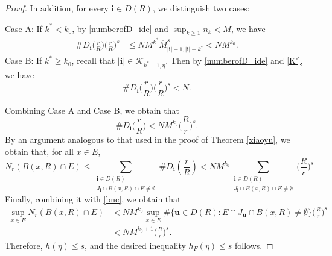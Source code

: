 \documentclass[12pt]{amsart}
\numberwithin{equation}{section}
\theoremstyle{plain}
\theoremstyle{remark}
\theoremstyle{definition}
\newcommand{\ok}{\overline{\mathcal{K}}}
\newcommand{\om}{\overline{M}}
\newcommand{\iii}{\mathbf{i}}
\newcommand{\bu}{\mathbf{u}}
\newcommand{\f}{\frac}
\renewcommand{\ge}{\geqslant}
\renewcommand{\le}{\leqslant}
\renewcommand{\leq}{\leqslant}
\begin{document}
\begin{proof}
	In addition, for every $\iii\in D(R)$, we distinguish two cases:
		
		\noindent	Case A: If $k^* < k_0$,  by  \eqref{numberofD_ide} and $\sup_{k\ge 1} n_k<M$, we have
		\begin{align*}
			\# D_{\iii}\Big(\f rR\Big)\Big(\f rR\Big)^s
			& \le NM^{k^*}\om_{|\iii|+1,|\iii|+k^*}^s< NM^{k_0}.
		\end{align*}
		Case B: If $k^* \ge k_0$, recall that $|\iii|\in\ok_{k^*+1,\eta}$. Then by \eqref{numberofD_ide} and \eqref{K'}, we have
		$$	
		\# D_{\iii}\Big(\f rR\Big)\Big(\f rR\Big)^s<N.
		$$	
	
	Combining Case A and Case B, we obtain that
		\begin{equation*}%
			\#D_{\iii}\Big(\f rR\Big)<NM^{k_0}\Big(\f Rr\Big)^s.
		\end{equation*}
By an argument analogous to that used in the proof of Theorem \ref{xiaoyu}, we obtain that,	for all $x\in E$, 
$$
N_r(B(x,R)\cap E)\le \sum_{\substack{\iii\in D(R)\\J_{\iii}\cap B(x,R)\cap E\neq \emptyset}}\# D_{\iii}\left(\frac r R\right)<NM^{k_0}\sum_{\substack{\iii\in D(R)\\J_{\iii}\cap B(x,R)\cap E\neq \emptyset}}\Big(\frac R r\Big)^s
$$
		Finally, combining it with \eqref{bnc}, we obtain that 
		\begin{align*}
			\sup_{x\in E}N_r(B(x,R)\cap E) &<NM^{k_0}\sup_{x\in E}\#\{\bu\in D(R):E\cap J_{\bu}\cap B(x,R)\neq \emptyset\}\Big(\frac R r\Big)^s\\
			&<NM^{k_0+1}\Big(\frac R r\Big)^s. 
		\end{align*}
	 Therefore, $h(\eta)\le s$, and the desired inequality $h_F(\eta) \leq s$ follows.
	\end{proof}
	
\end{document}
